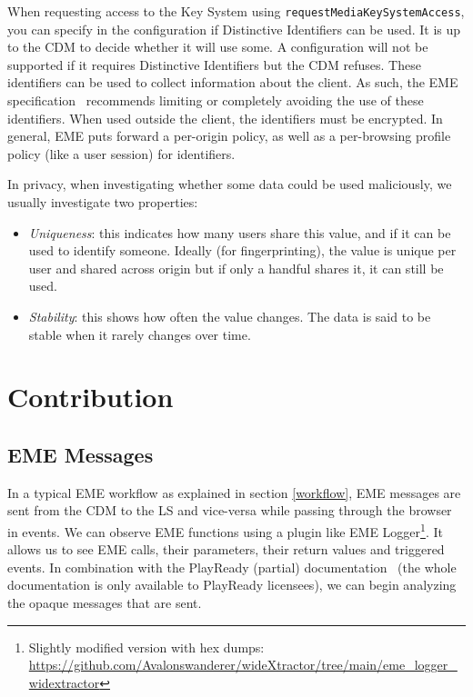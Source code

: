 \documentclass[11pt, a4paper]{IEEEtran}
\begin{document}
When requesting access to the Key System using \texttt{requestMediaKeySystemAccess}, you can specify in the configuration if Distinctive Identifiers can be used. It is up to the CDM to decide whether it will use some. A configuration will not be supported if it requires Distinctive Identifiers but the CDM refuses. These identifiers can be used to collect information about the client. As such, the EME specification~\cite{EME} recommends limiting or completely avoiding the use of these identifiers. When used outside the client, the identifiers must be encrypted. In general, EME puts forward a per-origin policy, as well as a per-browsing profile policy (like a user session) for identifiers.

In privacy, when investigating whether some data could be used maliciously, we usually investigate two properties: 
\begin{itemize}
	\item \emph{Uniqueness}: this indicates how many users share this value, and if it can be used to identify someone. Ideally (for fingerprinting), the value is unique per user and shared across origin but if only a handful shares it, it can still be used. 
	\item \emph{Stability}: this shows how often the value changes. The data is said to be stable when it rarely changes over time. 
\end{itemize}


\section{Contribution}

\subsection{EME Messages}

In a typical EME workflow as explained in section \ref{workflow}, EME messages are sent from the CDM to the LS and vice-versa while passing through the browser in events. We can observe EME functions using a plugin like EME Logger\footnote{Slightly modified version with hex dumps: \url{https://github.com/Avalonswanderer/wideXtractor/tree/main/eme_logger_widextractor}}. 
It allows us to see EME calls, their parameters, their return values and triggered events. In combination with the PlayReady (partial) documentation~\cite{playreadydoc} (the whole documentation is only available to PlayReady licensees), we can begin analyzing the opaque messages that are sent.
\end{document}
